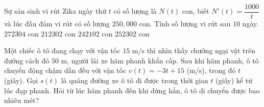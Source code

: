 \begin{ex}%
	Sự sản sinh vi rút Zika ngày thứ $t$ có số lượng là $N(t)$ con, biết $N'(t)=\dfrac{1000}{t}$ và lúc đầu đám vi rút có số lượng $250{,}000$ con. Tính số lượng vi rút sau $10$ ngày.
	\choice
	{$272304$ con}
	{$212302$ con}
	{$242102$ con}
	{\True $252302$ con}
\end{ex}
\begin{ex}%
	Một chiếc ô tô đang chạy với vận tốc $15$ m/s thì nhìn thấy chướng ngại vật trên đường cách đó $50$ m, người lái xe hãm phanh khẩn cấp. Sau khi hãm phanh, ô tô chuyển động chậm dần đều với vận tốc $v(t)=-3t+15$ (m/s), trong đó $t$ (giây). Gọi $s(t)$ là quãng đường xe ô tô đi được trong thời gian $t$ (giây) kể từ lúc đạp phanh. Hỏi từ lúc hãm phanh đến khi dừng hẳn, ô tô di chuyển được bao nhiêu mét?
\end{ex}

